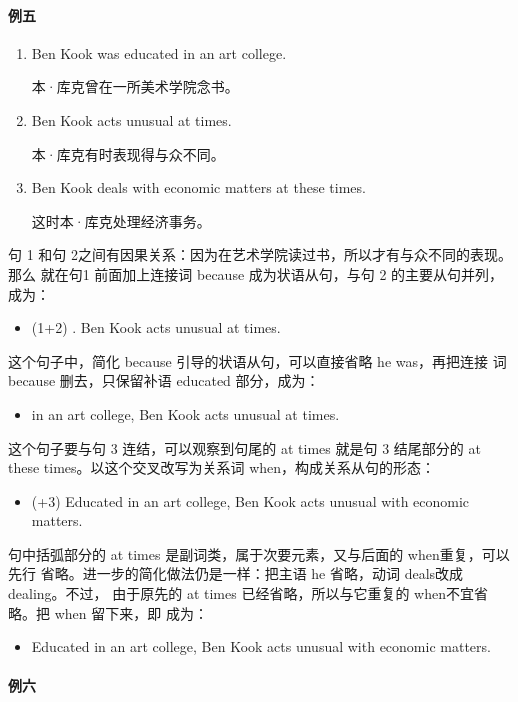 \paragraph{例五}

\begin{enumerate}
\item Ben Kook was educated in an art college.

  本·库克曾在一所美术学院念书。
\item Ben Kook acts unusual at times.

  本·库克有时表现得与众不同。
\item Ben Kook deals with economic matters at these times.

  这时本·库克处理经济事务。
\end{enumerate}

句 1 和句 2之间有因果关系：因为在艺术学院读过书，所以才有与众不同的表现。那么
就在句1 前面加上连接词 because 成为状语从句，与句 2 的主要从句并列，成为：
\begin{itemize}
\item (1+2) . Ben Kook acts unusual at
  times.
\end{itemize}
这个句子中，简化 because 引导的状语从句，可以直接省略 he was，再把连接
词because 删去，只保留补语 educated 部分，成为：
\begin{itemize}
\item {} in an art college, Ben Kook acts unusual at times.
\end{itemize}
这个句子要与句 3 连结，可以观察到句尾的 at times 就是句 3 结尾部分的 at
these times。以这个交叉改写为关系词 when，构成关系从句的形态：
\begin{itemize}
\item (+3) Educated in an art college, Ben Kook acts unusual  with economic matters.
\end{itemize}
句中括弧部分的 at times 是副词类，属于次要元素，又与后面的 when重复，可以先行
省略。进一步的简化做法仍是一样：把主语 he 省略，动词 deals改成 dealing。不过，
由于原先的 at times 已经省略，所以与它重复的 when不宜省略。把 when 留下来，即
成为：

\begin{itemize}
\item Educated in an art college, Ben Kook acts unusual  with
  economic matters.
\end{itemize}

\paragraph{例六}

